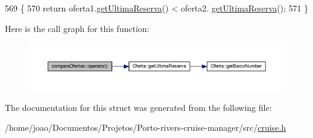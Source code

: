 \begin{DoxyCode}
569                                                            \{
570         \textcolor{keywordflow}{return} oferta1.\hyperlink{classOferta_a1caf2c681c14c9fbd04312b35f99b64c}{getUltimaReserva}() < oferta2.
      \hyperlink{classOferta_a1caf2c681c14c9fbd04312b35f99b64c}{getUltimaReserva}();
571     \}
\end{DoxyCode}


Here is the call graph for this function\+:\nopagebreak
\begin{figure}[H]
\begin{center}
\leavevmode
\includegraphics[width=350pt]{structcomparaOfertas_a8b792bc79e9870004caa3e95826a0f1f_cgraph}
\end{center}
\end{figure}




The documentation for this struct was generated from the following file\+:\begin{DoxyCompactItemize}
\item 
/home/joao/\+Documentos/\+Projetos/\+Porto-\/rivers-\/cruise-\/manager/src/\hyperlink{cruise_8h}{cruise.\+h}\end{DoxyCompactItemize}
